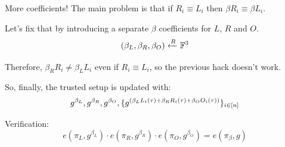 \documentclass{zkdl-presentation-template}
\begin{document}
    \begin{frame}{More coefficients!}
        The main problem is that if $R_i \equiv L_i$ then $\beta R_i \equiv \beta L_i$.

        Let's fix that by introducing a separate $\beta$ coefficients for $L$, $R$ and $O$.
        \begin{equation*}
            \left( \beta_L, \beta_R, \beta_O \right) \xleftarrow{R} \mathbb{F}^3
            \vspace{-5pt}
        \end{equation*}
        
        
        Therefore, $\beta_R R_i \neq \beta_L L_i$ even if $R_i \equiv L_i$, so the previous hack doesn't work.

        So, finally, the trusted setup is updated with:
        \vspace{-5pt}
        \begin{equation*}
            g^{\beta_L}, g^{\beta_R}, g^{\beta_O}, \{g^{\left( \beta_LL_i(\tau) + \beta_RR_i(\tau) + \beta_OO_i(\tau) \right)}\}_{i \in \left[ n \right]}
            \vspace{-5pt}
        \end{equation*}

        
        Verification:
        \vspace{-5pt}
        \begin{equation*}
            e(\pi_L, g^{\beta_L}) \cdot e(\pi_R, g^{\beta_R}) \cdot e(\pi_O, g^{\beta_O}) = e(\pi_{\beta}, g)
        \end{equation*}
    \end{frame}
\end{document}

